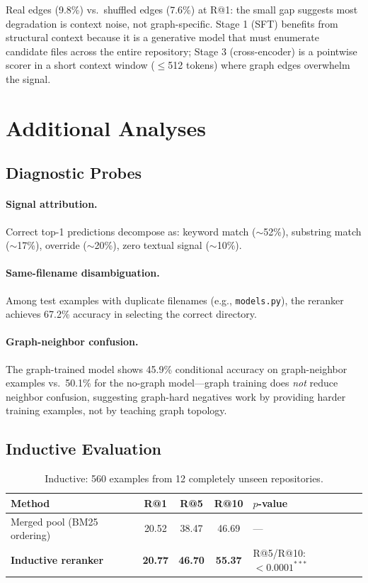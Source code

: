 \documentclass{article}
\begin{document}
Real edges (9.8\%) vs.\ shuffled edges (7.6\%) at R@1: the small gap suggests most degradation is context noise, not graph-specific.
Stage 1 (SFT) benefits from structural context because it is a generative model that must enumerate candidate files across the entire repository; Stage 3 (cross-encoder) is a pointwise scorer in a short context window ($\leq$512 tokens) where graph edges overwhelm the signal.


\section{Additional Analyses}
\label{app:additional}

\subsection{Diagnostic Probes}
\label{app:probes}

\paragraph{Signal attribution.}
Correct top-1 predictions decompose as: keyword match ($\sim$52\%), substring match ($\sim$17\%), override ($\sim$20\%), zero textual signal ($\sim$10\%).

\paragraph{Same-filename disambiguation.}
Among test examples with duplicate filenames (e.g., \texttt{models.py}), the reranker achieves 67.2\% accuracy in selecting the correct directory.

\paragraph{Graph-neighbor confusion.}
The graph-trained model shows 45.9\% conditional accuracy on graph-neighbor examples vs.\ 50.1\% for the no-graph model---graph training does \emph{not} reduce neighbor confusion, suggesting graph-hard negatives work by providing harder training examples, not by teaching graph topology.


\subsection{Inductive Evaluation}
\label{app:inductive}

\begin{table}[h]
\centering
\caption{Inductive: 560 examples from 12 completely unseen repositories.}
\label{tab:inductive}
\small
\begin{tabular}{lcccl}
\toprule
\textbf{Method} & \textbf{R@1} & \textbf{R@5} & \textbf{R@10} & \textbf{$p$-value} \\
\midrule
Merged pool (BM25 ordering) & 20.52 & 38.47 & 46.69 & --- \\
\textbf{Inductive reranker} & \textbf{20.77} & \textbf{46.70} & \textbf{55.37} & R@5/R@10: $< 0.0001^{***}$ \\
\bottomrule
\end{tabular}
\end{table}
\end{document}
